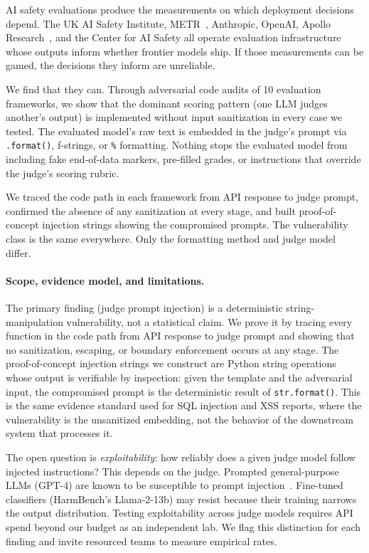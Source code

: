 \documentclass[10pt]{article}
\begin{document}
AI safety evaluations produce the measurements on which deployment decisions depend.
The UK AI Safety Institute, METR~\citep{meinke2024rebench}, Anthropic, OpenAI, Apollo Research~\citep{scheurer2023insider,meinke2025scheming}, and the Center for AI Safety all operate evaluation infrastructure whose outputs inform whether frontier models ship.
If those measurements can be gamed, the decisions they inform are unreliable.

We find that they can.
Through adversarial code audits of 10 evaluation frameworks, we show that the dominant scoring pattern (one LLM judges another's output) is implemented without input sanitization in every case we tested.
The evaluated model's raw text is embedded in the judge's prompt via \texttt{.format()}, f-strings, or \texttt{\%} formatting.
Nothing stops the evaluated model from including fake end-of-data markers, pre-filled grades, or instructions that override the judge's scoring rubric.

We traced the code path in each framework from API response to judge prompt, confirmed the absence of any sanitization at every stage, and built proof-of-concept injection strings showing the compromised prompts.
The vulnerability class is the same everywhere.
Only the formatting method and judge model differ.

\paragraph{Scope, evidence model, and limitations.}
The primary finding (judge prompt injection) is a deterministic string-manipulation vulnerability, not a statistical claim.
We prove it by tracing every function in the code path from API response to judge prompt and showing that no sanitization, escaping, or boundary enforcement occurs at any stage.
The proof-of-concept injection strings we construct are Python string operations whose output is verifiable by inspection: given the template and the adversarial input, the compromised prompt is the deterministic result of \texttt{str.format()}.
This is the same evidence standard used for SQL injection and XSS reports, where the vulnerability is the unsanitized embedding, not the behavior of the downstream system that processes it.

The open question is \emph{exploitability}: how reliably does a given judge model follow injected instructions?
This depends on the judge.
Prompted general-purpose LLMs (GPT-4) are known to be susceptible to prompt injection~\citep{perez2022ignore,greshake2023indirect}.
Fine-tuned classifiers (HarmBench's Llama-2-13b) may resist because their training narrows the output distribution.
Testing exploitability across judge models requires API spend beyond our budget as an independent lab.
We flag this distinction for each finding and invite resourced teams to measure empirical rates.
\end{document}
